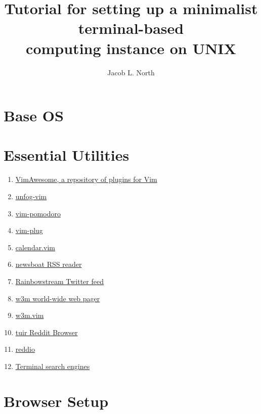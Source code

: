 \documentclass[]{article}
\title{Tutorial for setting up a minimalist terminal-based\\computing instance on UNIX}
\author{Jacob L. North}
\begin{document}
\maketitle

\vfill

\tableofcontents

\vfill

\section{Base OS}

\section{Essential Utilities}
\begin{enumerate}
    \item \href{https://vimawesome.com/}{VimAwesome, a repository of plugins for Vim}
    \item \href{https://github.com/unfog-io/unfog-vim}{unfog-vim}
    \item \href{https://github.com/mnick/vim-pomodoro}{vim-pomodoro}
    \item \href{https://github.com/junegunn/vim-plug}{vim-plug}
    \item \href{https://github.com/itchyny/calendar.vim}{calendar.vim}
    \item \href{https://github.com/newsboat/newsboat}{newsboat RSS reader}
    \item \href{https://github.com/orakaro/rainbowstream}{Rainbowstream Twitter feed}
    \item \href{https://github.com/tats/w3m}{w3m world-wide web pager}
    \item \href{https://github.com/yuratomo/w3m.vim}{w3m.vim}
    \item \href{https://gitlab.com/ajak/tuir}{tuir Reddit Browser}
    \item \href{https://gitlab.com/aaronNG/reddio}{reddio}
    \item \href{https://vitux.com/four-web-browsers-for-the-linux-command-line/}{Terminal search engines}
\end{enumerate}

\section{Browser Setup}
\end{document}

